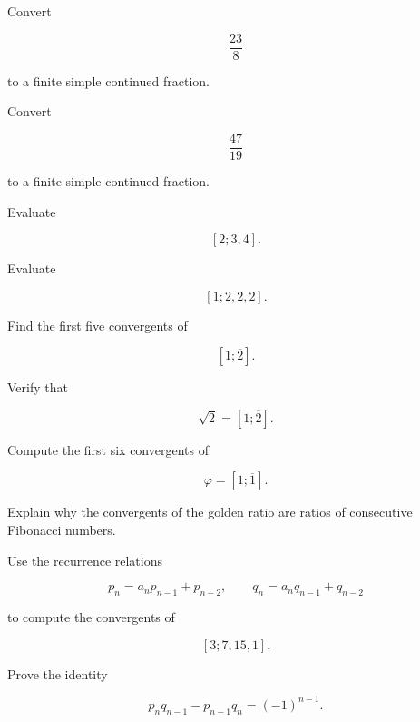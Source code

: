\begin{exercise}[1]
Convert

\[ \frac{23}{8} \]

to a finite simple continued fraction.
\end{exercise}

\begin{exercise}[1]
Convert

\[ \frac{47}{19} \]

to a finite simple continued fraction.
\end{exercise}

\begin{exercise}[2]
Evaluate

\[ [2;3,4]. \]
\end{exercise}

\begin{exercise}[2]
Evaluate

\[ [1;2,2,2]. \]
\end{exercise}

\begin{exercise}[2]
Find the first five convergents of

\[ [1;\overline2]. \]
\end{exercise}

\begin{exercise}[2]
Verify that

\[ \sqrt2=[1;\overline2]. \]
\end{exercise}

\begin{exercise}[2]
Compute the first six convergents of

\[ \varphi=[1;\overline1]. \]
\end{exercise}

\begin{exercise}[2]
Explain why the convergents of the golden ratio are ratios of consecutive
Fibonacci numbers.
\end{exercise}

\begin{exercise}[2]
Use the recurrence relations

\[ p_n=a_np_{n-1}+p_{n-2},\qquad q_n=a_nq_{n-1}+q_{n-2} \]

to compute the convergents of

\[ [3;7,15,1]. \]
\end{exercise}

\begin{exercise}[3]
Prove the identity

\[ p_nq_{n-1}-p_{n-1}q_n=(-1)^{n-1}. \]
\end{exercise}

